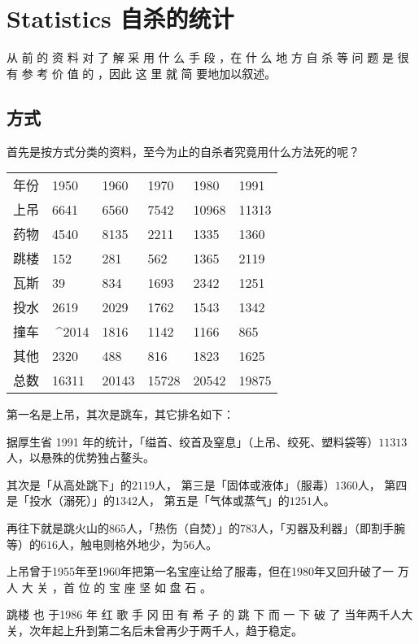 \documentclass[UTF8]{ctexart}
\begin{document}
\newpage

\section{Statistics 自杀的统计}

从 前 的 资 料 对 了 解 采 用 什 么 手 段 ，在 什 么 地 方 自 杀 等 问 题 是 很 有 参 考 价 值 的 ，因此 这 里 就 简 要地加以叙述。

\subsection{方式}

首先是按方式分类的资料，至今为止的自杀者究竟用什么方法死的呢？

\begin{table}[]
\center
\begin{tabular}{llllll}
年份 & 1950  & 1960  & 1970  & 1980  & 1991  \\
上吊 & 6641  & 6560  & 7542  & 10968 & 11313 \\
药物 & 4540  & 8135  & 2211  & 1335  & 1360  \\
跳楼 & 152   & 281   & 562   & 1365  & 2119  \\
瓦斯 & 39    & 834   & 1693  & 2342  & 1251  \\
投水 & 2619  & 2029  & 1762  & 1543  & 1342  \\
撞车 & ^^^^2014     & 1816  & 1142  & 1166  & 865   \\
其他 & 2320  & 488   & 816   & 1823  & 1625  \\
总数 & 16311 & 20143 & 15728 & 20542 & 19875
\end{tabular}
\end{table}

第一名是上吊，其次是跳车，其它排名如下：

据厚生省 1991 年的统计，「缢首、绞首及窒息」（上吊、绞死、塑料袋等）$11313$ 人，以悬殊的优势独占鳌头。

其次是「从高处跳下」的$2119$人，
第三是「固体或液体」（服毒）$1360$人，
第四是「投水（溺死）」的$1342$人，
第五是「气体或蒸气」的$1251$人。

再往下就是跳火山的$865$人，「热伤（自焚）」的$783$人，「刃器及利器」（即割手腕等）的$616$人，触电则格外地少，为$56$人。

上吊曾于1955年至1960年把第一名宝座让给了服毒，但在1980年又回升破了一 万 人 大 关 ，首 位 的 宝 座 坚 如 盘 石 。

跳楼 也 于1986 年 红 歌 手 冈 田 有 希 子 的 跳 下 而 一 下 破 了 当年两千人大关，次年起上升到第二名后未曾再少于两千人，趋于稳定。
\end{document}
